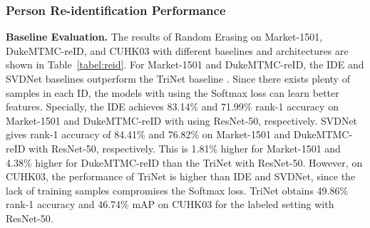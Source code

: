 \documentclass[10pt,twocolumn,letterpaper]{article}
\begin{document}
\subsubsection{Person Re-identification Performance}
\textbf{Baseline Evaluation.} The results of Random Erasing on Market-1501, DukeMTMC-reID, and CUHK03 with different baselines and architectures are shown in Table~\ref{tabel:reid}. For Market-1501 and DukeMTMC-reID, the IDE \cite{reid-survey} and SVDNet \cite{sun2017svdnet} baselines outperform the TriNet baseline \cite{hermans2017defense}. Since there exists plenty of samples in each ID, the models with using the Softmax loss can learn better features. Specially, the IDE achieves 83.14\% and 71.99\% rank-1 accuracy on Market-1501 and DukeMTMC-reID with using ResNet-50, respectively. SVDNet gives rank-1 accuracy of 84.41\% and 76.82\% on Market-1501 and DukeMTMC-reID with ResNet-50, respectively. This is 1.81\% higher for Market-1501 and 4.38\% higher for DukeMTMC-reID than the TriNet with ResNet-50.
However, on CUHK03, the performance of TriNet is higher than IDE and SVDNet, since the lack of training samples compromises the  Softmax loss.  TriNet obtains 49.86\% rank-1 accuracy and 46.74\% mAP on CUHK03 for the labeled setting with ResNet-50. 



\end{document}
